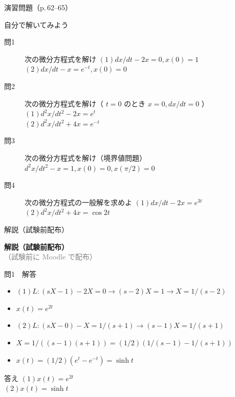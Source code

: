 \documentclass[aspectratio=43,professionalfonts,handout]{beamer}
\begin{document}
\begin{frame}{演習問題（p.\,62--65）}
  \begin{exampleblock}{自分で解いてみよう}
  \begin{description}
    \item[問1] 次の微分方程式を解け
    $(1) dx/dt - 2x = 0,  x(0) = 1$\\
    $(2) dx/dt - x = e^{-t},  x(0) = 0$\\
    \item[問2] 次の微分方程式を解け（ $t = 0$ のとき $x = 0, dx/dt = 0$ ）
    $(1) d^{2}x/dt^{2} - 2x = e^t$\\
    $(2) d^{2}x/dt^{2} + 4x = e^{-t}$\\
    \item[問3] 次の微分方程式を解け（境界値問題）
    $d^{2}x/dt^{2} - x = 1,  x(0) = 0,  x(\pi/2) = 0$\\
    \item[問4] 次の微分方程式の一般解を求めよ
    $(1) dx/dt - 2x = e^{3t}$\\
    $(2) d^{2}x/dt^{2} + 4x = \cos 2t$\\
  \end{description}
  \end{exampleblock}
\end{frame}

\begin{frame}{解説（試験前配布）}
  \vfill
  \begin{center}
  {\LARGE\bfseries\color{structure.fg} 解説（試験前配布）}\\[1em]
  {\normalsize\textcolor{gray}{（試験前に Moodle で配布）}}
  \end{center}
  \vfill
\end{frame}

\begin{frame}{問1　解答}
  \begin{block}{}
  \begin{itemize}\setlength{\itemsep}{2pt}
    \item $(1) L: (sX-1) - 2X = 0   \to   (s-2)X = 1   \to   X = 1/(s-2)$
    \item $    x(t) = e^{2t}$
    \item $(2) L: (sX-0) - X = 1/(s+1)   \to   (s-1)X = 1/(s+1)$
    \item $    X = 1/((s-1)(s+1)) = (1/2)(1/(s-1) - 1/(s+1))$
    \item $    x(t) = (1/2)(e^t - e^{-t}) = \sinh t$
  \end{itemize}
  \end{block}
  \begin{exampleblock}{答え}
  $(1) x(t) = e^{2t}$\\
  $(2) x(t) = \sinh t$\\
  \end{exampleblock}
\end{frame}
\end{document}
